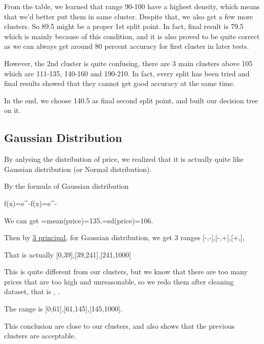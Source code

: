\documentclass{sig-alternate}
\begin{document}
	From the table, we learned that range 90-100 have a highest density, which means that we'd better put them in same cluster. 
	Despite that, we also get a few more clusters. So 89.5 might be a proper 1st split point. In fact, final result
	is 79.5 which is mainly because of this condition, and it is also proved to be quite correct as we can always get 
	around 80 percent accuracy for first cluster in later tests. 

	However, the 2nd cluster is quite confusing, there are 3 main clusters above 105 which are 111-135, 140-160 and 190-210. In fact,
	every split has been tried and final results showed that they cannot get good accuracy at the same time.


	In the end, we choose 140.5 as final second split point, and built our decision tree on it.

	\subsection{Gaussian Distribution}
	
	By anlysing the distribution of price, we realized that it is actually quite like Gaussian distribution (or Normal distribution). 
	
	By the formula of Gaussian distribution

	{\displaystyle f(x)={}\;e^{-{}}\!}{\displaystyle f(x)={}\;e^{-{}}\!}

	We can get \mu=mean(price)=135,\sigma=sd(price)=106. 

	Then by \href{https://en.wikipedia.org/wiki/Normal_distribution}{3 \mu principal},  for Gaussian distribution, we get 3 ranges [-\inf,\mu-\sigma],[\mu-\sigma,\mu+\sigma],[\mu+\sigma,\inf],

    That is actually [0,39],[39,241],[241,1000]

	This is quite different from our clusters, but we know that there are too many prices that are too high and unreasonable, so we redo them after cleaning dataset,
	that is , .
	
	The range is [0,61],[61,145],[145,1000]. 
	
	This conclusion are close to our clusters, and also shows that the previous clusters
	are acceptable.
	
\end{document}
